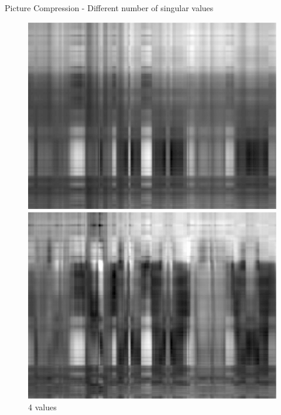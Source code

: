 \documentclass[10pt,a4paper]{beamer}
\begin{document}
\begin{frame}{Picture Compression - Different number of singular values}
\begin{figure}
\begin{minipage}{0.24\linewidth}
			\includegraphics[width=1\linewidth]{SVD/SVD.Tronquee.2.eps}
				\caption{2 values}
		\end{minipage}
		\begin{minipage}{0.24\linewidth}
			\includegraphics[width=1\linewidth]{SVD/SVD.Tronquee.4.eps}
				\caption{4 values}
		\end{minipage}
	\end{figure}
	\vspace{-0.4cm}
	

\end{frame}
\end{document}
